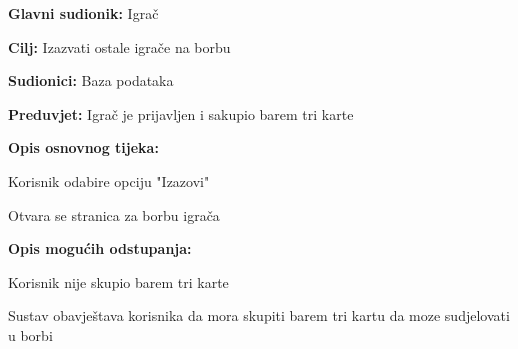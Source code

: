 					\noindent {}
					\begin{packed_item}
						
						\item \textbf{Glavni sudionik: }Igrač
						\item  \textbf{Cilj:} Izazvati ostale igrače na borbu
						\item  \textbf{Sudionici:} Baza podataka
						\item  \textbf{Preduvjet:} Igrač je prijavljen i sakupio barem tri karte
						\item  \textbf{Opis osnovnog tijeka:}
						
						\item[] \begin{packed_enum}
							
							\item Korisnik odabire opciju "Izazovi"
							\item Otvara se stranica za borbu igrača
						\end{packed_enum}
						
						\item  \textbf{Opis mogućih odstupanja:}
						
						\item[] \begin{packed_item}
							
							\item[2.a] Korisnik nije skupio barem tri karte
							\item[] \begin{packed_enum}
								
								\item Sustav obavještava korisnika da mora skupiti barem tri kartu da moze sudjelovati u borbi
								
							\end{packed_enum}
						\end{packed_item}
					\end{packed_item}
					
